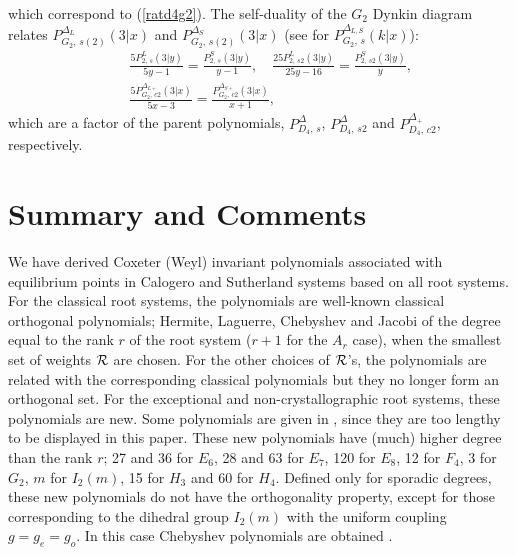 \documentclass[a4paper,12pt]{article}
\begin{document}
which correspond to (\ref{ratd4g2}).
The self-duality of the $G_2$ Dynkin diagram relates
$P_{G_2,\,s(2)}^{\Delta_L}(3|x)$ and
$P_{G_2,\,s(2)}^{\Delta_S}(3|x)$ (see \cite{poly} for
$P_{G_2,\,s}^{\Delta_{L,S}}(k|x)$):
\begin{eqnarray}
   &&\frac{5P_{2,\,s}^{L}(3|y)}{5y-1}=\frac{P_{2,\,s}^{S}(3|y)}{y-1},\quad
   \frac{25P_{2,\,s2}^{L}(3|y)}{25y-16}=\frac{P_{2,\,s2}^{S}(3|y)}{y},\\
%
   &&\frac{5P_{G_2,\,c2}^{\Delta_{L+}}(3|x)}{5x-3}
   =\frac{P_{G_2,\,c2}^{\Delta_{S+}}(3|x)}{x+1},
\end{eqnarray}
which are a factor of the parent polynomials, $P_{D_4,\,s}^{\Delta}$,
$P_{D_4,\,s2}^{\Delta}$ and $P_{D_4,\,c2}^{\Delta_+}$, respectively.

\section{Summary and Comments}
\label{comments}
\setcounter{equation}{0}

We have derived Coxeter (Weyl) invariant polynomials associated with
equilibrium points in Calogero and Sutherland systems based on all root
systems. For the classical root systems, the polynomials are well-known
classical orthogonal polynomials; Hermite, Laguerre, Chebyshev and Jacobi
of the degree equal to the rank $r$ of the root system ($r+1$ for the $A_r$
case), when the smallest set of weights ${\cal R}$ are chosen.
For the other choices of ${\cal R}$'s, the polynomials are related with
the corresponding classical polynomials but they no longer form an orthogonal
set. For the exceptional and non-crystallographic root systems,
these polynomials are new. Some polynomials are given in \cite{poly},
since they are too lengthy to be displayed in this paper.
These new polynomials have (much) higher degree than the rank $r$;
27 and 36 for $E_6$, 28 and 63 for $E_7$, 120 for $E_8$, 12 for $F_4$,
3 for $G_2$, $m$ for $I_2(m)$, 15 for $H_3$ and 60 for $H_4$.
Defined only for sporadic degrees, these new polynomials do not have
the orthogonality property, except for those corresponding to the dihedral
group $I_2(m)$ with the uniform coupling $g=g_e=g_o$.
In this case Chebyshev polynomials are obtained \cite{cs}.
\end{document}
